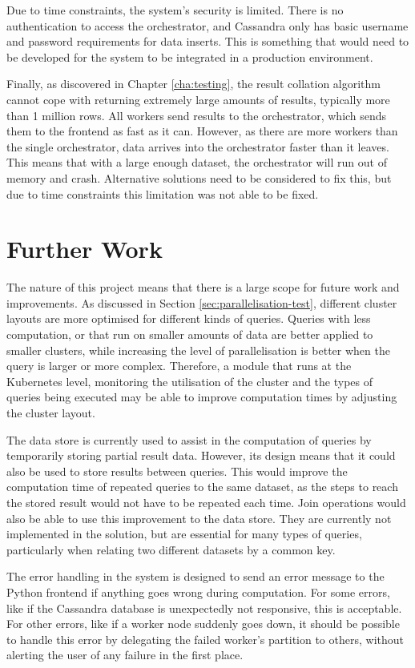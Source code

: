 Due to time constraints, the system's security is limited. There is no authentication to access the orchestrator, and Cassandra only has basic username and password requirements for data inserts. This is something that would need to be developed for the system to be integrated in a production environment.

Finally, as discovered in Chapter \ref{cha:testing}, the result collation algorithm cannot cope with returning extremely large amounts of results, typically more than 1 million rows. All workers send results to the orchestrator, which sends them to the frontend as fast as it can. However, as there are more workers than the single orchestrator, data arrives into the orchestrator faster than it leaves. This means that with a large enough dataset, the orchestrator will run out of memory and crash. Alternative solutions need to be considered to fix this, but due to time constraints this limitation was not able to be fixed.

\section{Further Work}
The nature of this project means that there is a large scope for future work and improvements. As discussed in Section \ref{sec:parallelisation-test}, different cluster layouts are more optimised for different kinds of queries. Queries with less computation, or that run on smaller amounts of data are better applied to smaller clusters, while increasing the level of parallelisation is better when the query is larger or more complex. Therefore, a module that runs at the Kubernetes level, monitoring the utilisation of the cluster and the types of queries being executed may be able to improve computation times by adjusting the cluster layout.

The data store is currently used to assist in the computation of queries by temporarily storing partial result data. However, its design means that it could also be used to store results between queries. This would improve the computation time of repeated queries to the same dataset, as the steps to reach the stored result would not have to be repeated each time. Join operations would also be able to use this improvement to the data store. They are currently not implemented in the solution, but are essential for many types of queries, particularly when relating two different datasets by a common key.

The error handling in the system is designed to send an error message to the Python frontend if anything goes wrong during computation. For some errors, like if the Cassandra database is unexpectedly not responsive, this is acceptable. For other errors, like if a worker node suddenly goes down, it should be possible to handle this error by delegating the failed worker's partition to others, without alerting the user of any failure in the first place.


